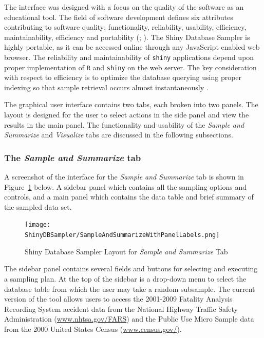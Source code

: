 \documentclass[11pt]{isuthesis}\usepackage[]{graphicx}\usepackage[]{color}
\begin{document}
The interface was designed with a focus on the quality of the software as an educational tool. The field of software development defines six attributes contributing to software quality: functionality, reliability, usability, efficiency, maintainability, efficiency and portability (\citealt{bevan1997quality}; \citealt{manuel2002quality}). The Shiny Database Sampler is highly portable, as it can be accessed online through any JavaScript enabled web browser. The reliability and maintainability of \texttt{shiny} applications depend upon proper implementation of \texttt{R} and \texttt{shiny} on the web server. The key consideration with respect to efficiency is to optimize the database querying using proper indexing so that sample retrieval occurs almost instantaneously \citep{schwartz2012high}. 

The graphical user interface contains two tabs, each broken into two panels. The layout is designed for the user to select actions in the side panel and view the results in the main panel. The functionality and usability of the \textit{Sample and Summarize} and \textit{Visualize} tabs are discussed in the following subsections. 

\subsubsection{The \textit{Sample and Summarize} tab}

A screenshot of the interface for the \textit{Sample and Summarize} tab is shown in Figure~\ref{fig:samplesummarizetab} below. A sidebar panel which contains all the sampling options and controls, and a main panel which contains the data table and brief summary of the sampled data set.

\begin{figure}[hbtp]
\centering
\texttt{[image: ShinyDBSampler/SampleAndSummarizeWithPanelLabels.png]}
\caption{Shiny Database Sampler Layout for \textit{Sample and Summarize} Tab} 
\label{fig:samplesummarizetab}
\end{figure}

The sidebar panel contains several fields and buttons for selecting and executing a sampling plan.  At the top of the sidebar is a drop-down menu to select the database table from which the user may take a random subsample.  The current version of the tool allows users to access the 2001-2009 Fatality Analysis Recording System accident data from the National Highway Traffic Safety Administration (\url{www.nhtsa.gov/FARS}) and the Public Use Micro Sample data from the 2000 United States Census (\url{www.census.gov/}).
\end{document}
